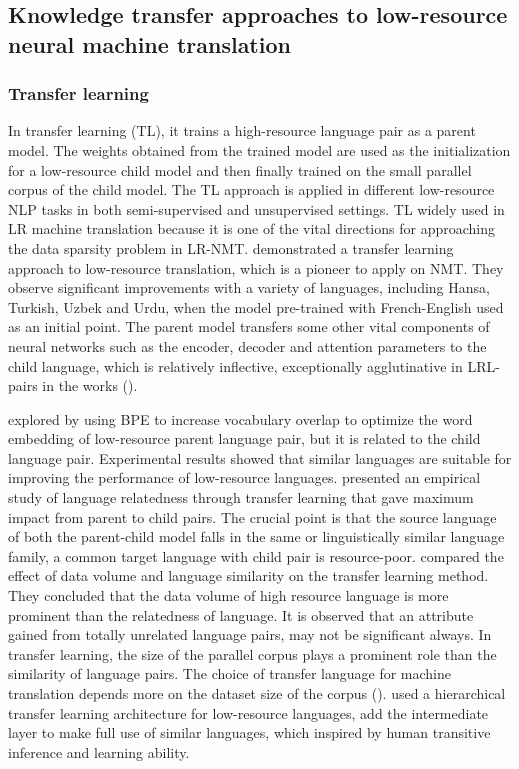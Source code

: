 \documentclass[manuscript,screen]{acmart}
\begin{document}
\subsection{Knowledge transfer approaches to low-resource neural machine translation}
\subsubsection{\bf{Transfer learning}}
In transfer learning (TL), it trains a high-resource language pair as a parent model. The weights obtained from the trained model are used as the initialization for a low-resource child model and then finally trained on the small parallel corpus of the child model. The TL approach is applied in different low-resource NLP tasks in both semi-supervised and unsupervised settings. TL widely used in LR machine translation because it is one of the vital directions for approaching the data sparsity problem in LR-NMT.
\citet{zoph2016transfer} demonstrated a transfer learning approach to low-resource translation, which is a pioneer to apply on NMT. They observe significant improvements with a variety of languages, including Hansa, Turkish, Uzbek and Urdu, when the model pre-trained with French-English used as an initial point.
The parent model transfers some other vital components of neural networks such as the encoder, decoder and attention parameters to the child language, which is relatively inflective, exceptionally agglutinative in LRL-pairs in the works (\citet{zoph2016transfer,  passban2017translating, nguyen2017transfer, dabre2017empirical, maimaiti2018discussion, maimaiti2019multi, luo2019hierarchical, luo2020joint}).

\citet{nguyen2017transfer} explored by using BPE to increase vocabulary overlap to optimize the word embedding of low-resource parent language pair, but it is related to the child language pair. Experimental results showed that similar languages are suitable for improving the performance of low-resource languages.
\citet{dabre2017empirical} presented an empirical study of language relatedness through transfer learning that gave maximum impact from parent to child pairs. The crucial point is that the source language of both the parent-child model falls in the same or linguistically similar language family, a common target language with child pair is resource-poor. 
\citet{kocmi2018trivial} compared the effect of data volume and language similarity on the transfer learning method. They concluded that the data volume of high resource language is more prominent than the relatedness of language. It is observed that an attribute gained from totally unrelated language pairs, may not be significant always. In transfer learning, the size of the parallel corpus plays a prominent role than the similarity of language pairs. The choice of transfer language for machine translation depends more on the dataset size of the corpus (\citet{lin2019choosing}).
\citet{luo2019hierarchical} used a hierarchical transfer learning architecture for low-resource languages, add the intermediate layer to make full use of similar languages, which inspired by human transitive inference and learning ability.
\end{document}
